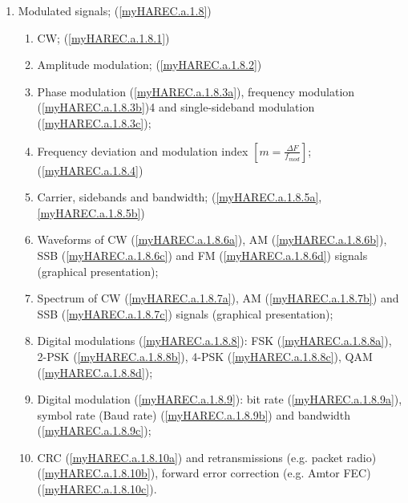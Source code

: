\begin{enumerate}
\begin{enumerate}
\item Modulated signals; (\ref{myHAREC.a.1.8})\label{HAREC.a.1.8}
\begin{enumerate}
\item CW; (\ref{myHAREC.a.1.8.1})\label{HAREC.a.1.8.1}
\item Amplitude modulation; (\ref{myHAREC.a.1.8.2})\label{HAREC.a.1.8.2}
\item Phase modulation (\ref{myHAREC.a.1.8.3a})\label{HAREC.a.1.8.3a},
  frequency modulation (\ref{myHAREC.a.1.8.3b})\label{HAREC.a.1.8.3b}4
  and single-sideband modulation (\ref{myHAREC.a.1.8.3c})\label{HAREC.a.1.8.3c};
\item Frequency deviation and modulation index
  \(\left[m = \frac{\Delta F}{f_{mod}}\right]\);
  (\ref{myHAREC.a.1.8.4})\label{HAREC.a.1.8.4}
\item Carrier, sidebands and bandwidth;
  (\ref{myHAREC.a.1.8.5a}, \ref{myHAREC.a.1.8.5b})\label{HAREC.a.1.8.5}
\item Waveforms of CW (\ref{myHAREC.a.1.8.6a})\label{HAREC.a.1.8.6a},
  AM (\ref{myHAREC.a.1.8.6b})\label{HAREC.a.1.8.6b},
  SSB (\ref{myHAREC.a.1.8.6c})\label{HAREC.a.1.8.6c}
  and FM (\ref{myHAREC.a.1.8.6d})\label{HAREC.a.1.8.6d}
  signals (graphical presentation);
\item Spectrum of CW (\ref{myHAREC.a.1.8.7a})\label{HAREC.a.1.8.7a},
  AM (\ref{myHAREC.a.1.8.7b})\label{HAREC.a.1.8.7b}
  and SSB (\ref{myHAREC.a.1.8.7c})\label{HAREC.a.1.8.7c}
  signals (graphical presentation);
\item Digital modulations (\ref{myHAREC.a.1.8.8})\label{HAREC.a.1.8.8}:
  FSK (\ref{myHAREC.a.1.8.8a})\label{HAREC.a.1.8.8a},
  2-PSK (\ref{myHAREC.a.1.8.8b})\label{HAREC.a.1.8.8b},
  4-PSK (\ref{myHAREC.a.1.8.8c})\label{HAREC.a.1.8.8c},
  QAM (\ref{myHAREC.a.1.8.8d})\label{HAREC.a.1.8.8d};
\item Digital modulation (\ref{myHAREC.a.1.8.9})\label{HAREC.a.1.8.9}:
  bit rate (\ref{myHAREC.a.1.8.9a})\label{HAREC.a.1.8.9a},
  symbol rate (Baud rate) (\ref{myHAREC.a.1.8.9b})\label{HAREC.a.1.8.9b}
  and bandwidth (\ref{myHAREC.a.1.8.9c})\label{HAREC.a.1.8.9c};
\item CRC (\ref{myHAREC.a.1.8.10a})\label{HAREC.a.1.8.10a}
  and retransmissions (e.g. packet radio)
  (\ref{myHAREC.a.1.8.10b})\label{HAREC.a.1.8.10b},
  forward error correction (e.g. Amtor FEC)
  (\ref{myHAREC.a.1.8.10c})\label{HAREC.a.1.8.10c}.
\end{enumerate}


\end{enumerate}
\end{enumerate}
